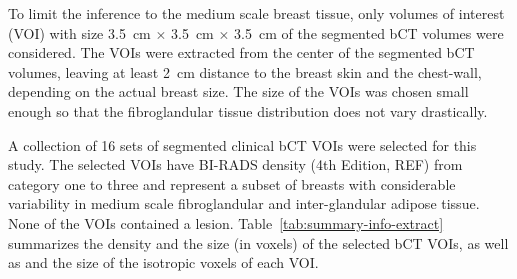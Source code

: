 \documentclass[journal]{IEEEtran}
\begin{document}
To limit the inference to the medium scale breast tissue, only volumes
of interest (VOI) with size \SI{3.5}{\cm} $\times$ \SI{3.5}{\cm}
$\times$ \SI{3.5}{\cm} of the segmented bCT volumes were
considered. The VOIs were extracted from the center of the segmented
bCT volumes, leaving at least \SI{2}{\cm} distance to the breast skin
and the chest-wall, depending on the actual breast size. The size of
the VOIs was chosen small enough so that the fibroglandular tissue
distribution does not vary drastically.

A collection of 16 sets of segmented clinical bCT VOIs were selected
for this study. The selected VOIs have BI-RADS density (4th Edition,
REF) from category one to three and represent a subset of breasts with
considerable variability in medium scale fibroglandular and
inter-glandular adipose tissue. None of the VOIs contained a
lesion. Table~\ref{tab:summary-info-extract} summarizes the density
and the size (in voxels) of the selected bCT VOIs, as well as and the
size of the isotropic voxels of each VOI.

\end{document}
